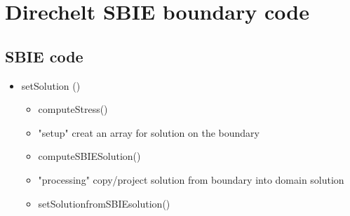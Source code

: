 \chapter{Direchelt SBIE boundary code}
\label{cha:sbiefemcoupling:formulation}

\section{SBIE code}

\begin{itemize}
\item setSolution ()\\
         \begin{itemize}
         \item computeStress()
         \item "setup" creat an array for solution on the boundary
         \item computeSBIESolution()
         \item "processing" copy/project solution from boundary into domain solution
         \item setSolutionfromSBIEsolution()
         \end{itemize}
		
\end{itemize}

